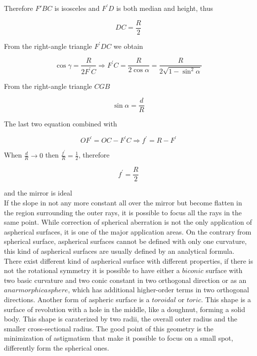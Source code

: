 \noindent Therefore $F{'}BC $ is isosceles and $F^{'}D $ is both median and height, thus

\begin{equation}
	DC = \frac{R}{2}
	\label{eq: DC}
\end{equation}

\noindent From the right-angle triangle $F^{'}DC $ we obtain

\begin{equation}
	\cos \gamma = \frac{R}{2F^{'}C} \Rightarrow F^{'}C = \frac{R}{2 \cos \alpha} = \frac{R}{2 \sqrt{1 - \sin^2 \alpha}}
	\label{eq: F'C}
\end{equation}

\noindent From the right-angle triangle $CGB $

\begin{equation}
	\sin \alpha = \frac{d}{R}
	\label{eq: sin a}
\end{equation}

\noindent The last two equation combined with 

\begin{equation}
	OF^{'} = OC - F^{'}C \Rightarrow f^{'} = R - F^{'}
	\label{eq: f'}
\end{equation}

\noindent When $\frac{d}{R} \rightarrow 0 $ then $\frac{f^{'}}{R} = \frac{1}{2} $, therefore

 \begin{equation}
 	f^{'} = \frac{R}{2}
 	\label{eq: f' new}
 \end{equation}
 
 \noindent and the mirror is ideal
 \\
If the slope in not any more constant all over the mirror but become flatten in the region surrounding the outer rays, it is possible to focus all the rays in the same point. While correction of spherical aberration is not the only application of aspherical surfaces, it is one of the major application areas. On the contrary from spherical surface, aspherical surfaces cannot be defined with only one curvature, this kind of aspherical surfaces are usually defined by an analytical formula. There exist different kind of aspherical surface with different properties, if there is not the rotational symmetry it is possible to have either a $biconic $ surface with two basic curvature and two conic constant in two orthogonal direction or as an $ anarmorphic asphere $, which has additional higher-order terms in two orthogonal directions.
\noindent Another form of aspheric surface is a $toroidal $ or $toric$.  This shape is a surface of revolution with a hole in the middle, like a doughnut, forming a solid body. This shape is caraterized by two radii, the overall outer radius and the smaller cross-sectional radius. The good point of this geometry is the minimization of astigmatism that make it possible to focus on a small spot, differently form the spherical ones.


